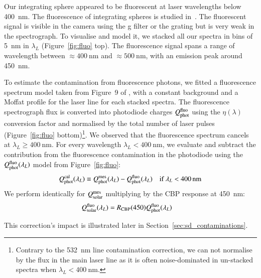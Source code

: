 Our integrating sphere appeared to be fluorescent at laser wavelengths below \SI{400}{\nano\meter}. The fluorescence of integrating spheres is studied in~\cite{shaw2007ultraviolet}. The fluorescent signal is visible in the \SD camera using the g filter or the grating but is very weak in the spectrograph. To visualise and model it, we stacked all our spectra in bins of \SI{5}{\nano\meter} in $\lambda_L$ (Figure~\ref{fig:fluo} top). The fluorescence signal spans a range of wavelength between $\approx \SI{400}{\nano\meter}$ and $\approx\SI{500}{\nano\meter}$, with an emission peak around \SI{450}{\nano\meter}. %

To estimate the contamination from fluorescence photons, we fitted a fluorescence spectrum model taken from Figure~9 of \cite{shaw2007ultraviolet}, with a constant background and a Moffat profile for the laser line for each stacked spectra. The fluorescence spectrograph flux is converted into photodiode charges $Q_{\mathrm{phot}}^{\mathrm{fluo}}$ using the $\eta(\lambda)$ conversion factor and normalised by the total number of laser pulses (Figure~\ref{fig:fluo} bottom)\footnote{Contrary to the \SI{532}{\nano\meter} line contamination correction, we can not normalise by the flux in the main laser line as it is often noise-dominated in un-stacked spectra when $\lambda_L < \SI{400}{\nano\meter}$.}. We observed that the fluorescence spectrum cancels at $\lambda_L \geq \SI{400}{\nano\meter}$. For every wavelength $\lambda_L < \SI{400}{\nano\meter}$, we evaluate and subtract the contribution from the fluorescence contamination in the photodiode using the $Q_{\mathrm{phot}}^{\mathrm{fluo}}(\lambda_L)$ model from Figure~\ref{fig:fluo}:
\begin{equation}
        Q_{\mathrm{phot}}^{\mathrm{cal}}(\lambda_L) \equiv  Q_{\mathrm{phot}}^{\mathrm{mes}}(\lambda_L) - Q_{\mathrm{phot}}^{\mathrm{fluo}}(\lambda_L) \quad\text{if}\ \lambda_L < \SI{400}{\nano\meter}
        \label{eq:qphot_calfluo}
\end{equation}
We perform identically for $Q_{\mathrm{solar}}^{\mathrm{mes}}$ multiplying by the CBP response at \SI{450}{\nano\meter}: 
\begin{equation}
\begin{aligned}
    Q_{\mathrm{solar}}^{\rm fluo}(\lambda_L) & = R_{\mathrm{CBP}}(450)  Q_{\mathrm{phot}}^{\rm fluo}(\lambda_L)
    \label{eq:qsolar_calfluo}
\end{aligned}
\end{equation}

This correction's impact is illustrated later in Section~\ref{sec:sd_contaminations}.

